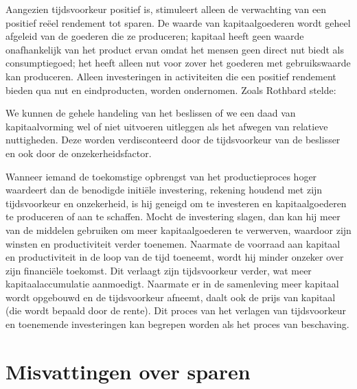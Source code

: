 Aangezien tijdsvoorkeur positief is, stimuleert alleen de verwachting van een positief reëel rendement tot sparen. De waarde van kapitaalgoederen wordt geheel afgeleid van de goederen die ze produceren; kapitaal heeft geen waarde onafhankelijk van het product ervan omdat het mensen geen direct nut biedt als consumptiegoed; het heeft alleen nut voor zover het goederen met gebruikswaarde kan produceren. Alleen investeringen in activiteiten die een positief rendement bieden qua nut en eindproducten, worden ondernomen. Zoals Rothbard stelde:

\begin{blockquotebox}
    We kunnen de gehele handeling van het beslissen of we een daad van kapitaalvorming wel of niet uitvoeren uitleggen als het afwegen van relatieve nuttigheden. Deze worden \textquotesingle verdisconteerd\textquotesingle{} door de tijdsvoorkeur van de beslisser en ook door de onzekerheidsfactor.\footnotemark
\end{blockquotebox}
\autocite{68}

Wanneer iemand de toekomstige opbrengst van het productieproces hoger waardeert dan de benodigde initiële investering, rekening houdend met zijn tijdsvoorkeur en onzekerheid, is hij geneigd om te investeren en kapitaalgoederen te produceren of aan te schaffen. Mocht de investering slagen, dan kan hij meer van de middelen gebruiken om meer kapitaalgoederen te verwerven, waardoor zijn winsten en productiviteit verder toenemen. Naarmate de voorraad aan kapitaal en productiviteit in de loop van de tijd toeneemt, wordt hij minder onzeker over zijn financiële toekomst. Dit verlaagt zijn tijdsvoorkeur verder, wat meer kapitaalaccumulatie aanmoedigt. Naarmate er in de samenleving meer kapitaal wordt opgebouwd en de tijdsvoorkeur afneemt, daalt ook de prijs van kapitaal (die wordt bepaald door de rente). Dit proces van het verlagen van tijdsvoorkeur en toenemende investeringen kan begrepen worden als het proces van beschaving.

\hypertarget{misvattingen-over-sparen}{%
\section{Misvattingen over sparen}\label{misvattingen-over-sparen}}

